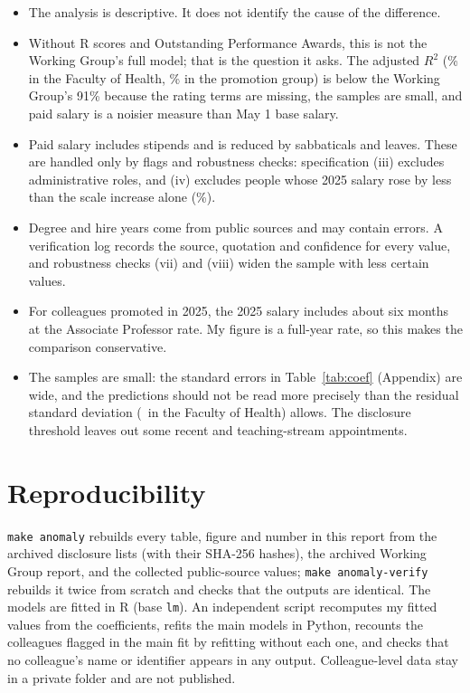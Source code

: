\documentclass{article}
\begin{document}
\begin{itemize}[leftmargin=*,itemsep=0em,topsep=0.2em]
    \item The analysis is descriptive. It does not identify the cause of the difference.
    \item Without R scores and Outstanding Performance Awards, this is not the Working Group's full model; that is the question it asks. The adjusted $R^2$ (\OnemainAdjRsq\% in the Faculty of Health, \TwomainAdjRsq\% in the promotion group) is below the Working Group's 91\% because the rating terms are missing, the samples are small, and paid salary is a noisier measure than May 1 base salary.
    \item Paid salary includes stipends and is reduced by sabbaticals and leaves. These are handled only by flags and robustness checks: specification (iii) excludes administrative roles, and (iv) excludes people whose 2025 salary rose by less than the scale increase alone (\LeaveThreshold\%).
    \item Degree and hire years come from public sources and may contain errors. A verification log records the source, quotation and confidence for every value, and robustness checks (vii) and (viii) widen the sample with less certain values.
    \item For colleagues promoted in 2025, the 2025 salary includes about six months at the Associate Professor rate. My figure is a full-year rate, so this makes the comparison conservative.
    \item The samples are small: the standard errors in Table~\ref{tab:coef} (Appendix) are wide, and the predictions should not be read more precisely than the residual standard deviation (\OnemainResidSD\ in the Faculty of Health) allows. The disclosure threshold leaves out some recent and teaching-stream appointments.
\end{itemize}

\section*{Reproducibility}

\texttt{make anomaly} rebuilds every table, figure and number in this report from the archived disclosure lists (with their SHA-256 hashes), the archived Working Group report, and the collected public-source values; \texttt{make anomaly-verify} rebuilds it twice from scratch and checks that the outputs are identical. The models are fitted in R (base \texttt{lm}). An independent script recomputes my fitted values from the coefficients, refits the main models in Python, recounts the colleagues flagged in the main fit by refitting without each one, and checks that no colleague's name or identifier appears in any output. Colleague-level data stay in a private folder and are not published.
\end{document}
